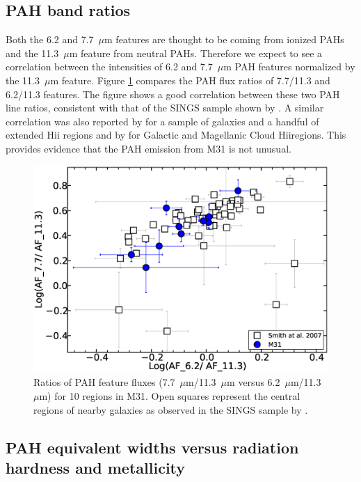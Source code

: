 
\subsection{PAH band ratios}
\label{sect:pah_ratios}

Both the 6.2 and 7.7~$\mu$m features are thought to be coming from ionized PAHs and the 11.3~$\mu$m feature from neutral PAHs. Therefore we expect to see a correlation between the intensities of 6.2 and 7.7~$\mu$m PAH features normalized by the 11.3~$\mu$m feature.  Figure \ref{PAHlines}  compares the PAH flux ratios of 7.7/11.3  and 6.2/11.3 features. The figure shows a good correlation between these two PAH line ratios, consistent with that of the SINGS sample shown by \citet{Smith:2007lr}.
A similar correlation was also reported by  \citet{Galliano2008} for a sample of galaxies and a handful of extended H{\sc ii} regions
and by \citet{Vermeij2002} for Galactic and Magellanic Cloud H{\sc ii}regions. This provides evidence that the PAH emission from M31 is not unusual. 


\begin{figure}
\centering
\includegraphics[scale = 0.25]{./fig8.eps}
\caption{Ratios of PAH feature fluxes (7.7~$\mu$m/11.3~$\mu$m versus 6.2~$\mu$m/11.3~$\mu$m) for 10 regions in M31.
Open squares represent the central regions of nearby galaxies as observed in the SINGS sample by \citet{Smith:2007lr}.
}
\label{PAHlines}
\end{figure}


\subsection{PAH equivalent widths versus radiation hardness and metallicity}
\label{sect:eqw_rh}

